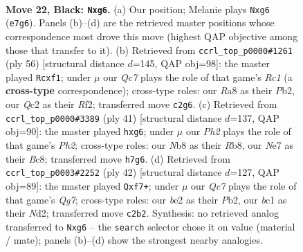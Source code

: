 \documentclass[11pt]{article}
\begin{document}
\clearpage

\begin{figure}[p]\centering
\begin{subfigure}{0.46\textwidth}\centering
\resizebox{\linewidth}{!}{%
\newchessgame
\chessboard[
  setfen={rnb1rk2/1p2np1p/4p1P1/p1P1P3/P4P2/7Q/2q1B3/R1B1K1NR b KQ - 0 22},
  showmover=false,
  pgfstyle=straightmove, color=movearrow, markmove={e7-g6}
]}
\caption{}
\end{subfigure}\hfill
\begin{subfigure}{0.46\textwidth}\centering
\resizebox{\linewidth}{!}{%
\newchessgame
\chessboard[
  setfen={1k1r1b1r/1pp1nQp1/7q/P3P3/1p1P4/4P3/1P1B1R1P/2R2bK1 w - - 0 29},
  showmover=false,
  pgfstyle=straightmove, color=movearrow, markmove={c1-f1}
]}
\caption{}
\end{subfigure}
\\[4pt]
\begin{subfigure}{0.46\textwidth}\centering
\resizebox{\linewidth}{!}{%
\newchessgame
\chessboard[
  setfen={1rb3k1/p3p2p/4PrP1/P1pqNn2/3p4/8/1P3PP1/R1BQR1K1 b - - 0 21},
  showmover=false,
  pgfstyle=straightmove, color=movearrow, markmove={h7-g6}
]}
\caption{}
\end{subfigure}\hfill
\begin{subfigure}{0.46\textwidth}\centering
\resizebox{\linewidth}{!}{%
\newchessgame
\chessboard[
  setfen={4r3/1k3pQp/p2r1n2/2b1p3/P3P3/1p6/1PqN1PPP/R1B1R1K1 w - - 1 22},
  showmover=false,
  pgfstyle=straightmove, color=movearrow, markmove={g7-f7}
]}
\caption{}
\end{subfigure}
\caption{\textbf{Move 22, Black: \texttt{Nxg6}.} (a) Our position; Melanie plays \texttt{Nxg6} (\texttt{e7g6}). Panels (b)--(d) are the retrieved master positions whose correspondence most drove this move (highest QAP objective among those that transfer to it). (b) Retrieved from \texttt{ccrl\_top\_p0000\#1261} (ply 56) [structural distance $d$=145, QAP obj=98]: the master played \texttt{Rcxf1}; under $\mu$ our \emph{Qc7} plays the role of that game's \emph{Rc1} (a \textbf{cross-type} correspondence); cross-type roles: our \emph{R}a8 as their \emph{P}b2, our \emph{Q}c2 as their \emph{R}f2; transferred move \texttt{c2g6}. (c) Retrieved from \texttt{ccrl\_top\_p0000\#3389} (ply 41) [structural distance $d$=137, QAP obj=90]: the master played \texttt{hxg6}; under $\mu$ our \emph{Ph2} plays the role of that game's \emph{Ph2}; cross-type roles: our \emph{N}b8 as their \emph{R}b8, our \emph{N}e7 as their \emph{B}c8; transferred move \texttt{h7g6}. (d) Retrieved from \texttt{ccrl\_top\_p0003\#2252} (ply 42) [structural distance $d$=127, QAP obj=89]: the master played \texttt{Qxf7+}; under $\mu$ our \emph{Qc7} plays the role of that game's \emph{Qg7}; cross-type roles: our \emph{b}e2 as their \emph{P}b2, our \emph{b}c1 as their \emph{N}d2; transferred move \texttt{c2b2}. Synthesis: no retrieved analog transferred to \texttt{Nxg6} -- the \texttt{search} selector chose it on value (material / mate); panels (b)--(d) show the strongest nearby analogies.}
\label{fig:thought-m43}
\end{figure}
\end{document}
